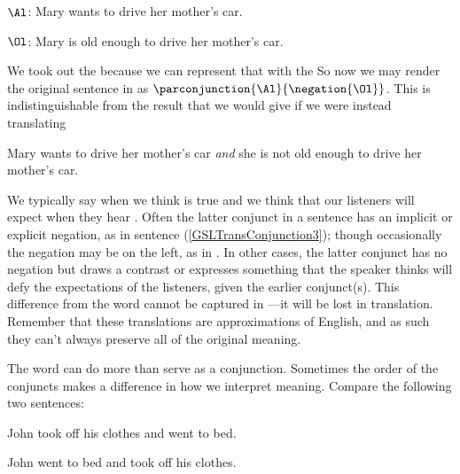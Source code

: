 	\begin{description}[itemsep=0em]
		\item[Translation Key:] \hfill{} 
		\begin{description}[itemsep=0em]
			\item $\Al$: Mary wants to drive her mother's car.
			\item $\Ol$: Mary is old enough to drive her mother's car.
		\end{description} 
	\end{description}

\noindent{}We took out the  because we can represent that with the \mention{$\NEGATION$} So now we may render the original sentence in \GSL{} as $\parconjunction{\Al}{\negation{\Ol}}$.  This is indistinguishable from the result that we would give if we were instead translating

\begin{menumerate}
	\item Mary wants to drive her mother's car \emph{and} she is not old enough to drive her mother's car.
\end{menumerate}

\noindent{}We typically say  when we think  is true and we think that our listeners will expect \mention{$\THETA$} when they hear \mention{$\PHI$}.  Often the latter conjunct in a  sentence has an implicit or explicit negation, as in sentence (\ref{GSLTransConjunction3}); though occasionally the negation may be on the left, as in .  In other cases, the latter conjunct has no negation but draws a contrast or expresses something that the speaker thinks will defy the expectations of the listeners, given the earlier conjunct(s).  This difference from the word  cannot be captured in \GSL{}---it will be lost in translation.  Remember that these \GSL{} translations are approximations of English, and as such they can't always preserve all of the original meaning.

The word  can do more than serve as a conjunction.  Sometimes the order of the conjuncts makes a difference in how we interpret meaning. Compare the following two sentences:

\begin{menumerate}
	\item\label{GSLTransConjunction4} John took off his clothes and went to bed.
\end{menumerate}
\begin{menumerate}
	\item\label{GSLTransConjunction5} John went to bed and took off his clothes.
\end{menumerate}

